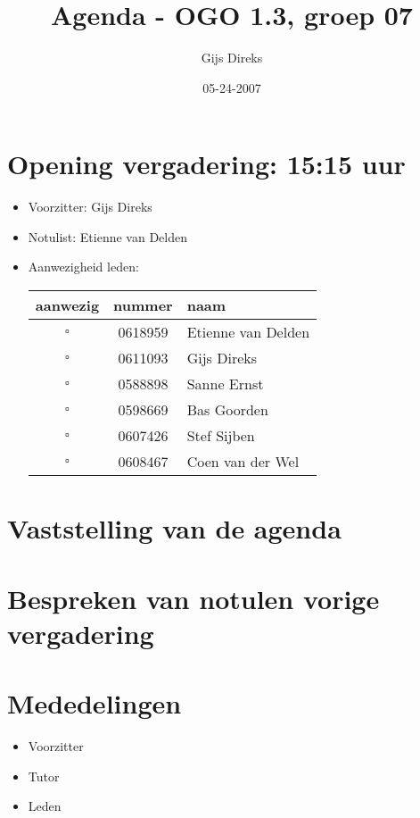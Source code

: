 \documentclass[]{article}
\title{Agenda - OGO 1.3, groep 07 }
\author{Gijs Direks}
\date{05-24-2007}
\begin{document}
\maketitle


\section{Opening vergadering: 15:15 uur }
  \begin{itemize}
    \item Voorzitter: Gijs Direks
    \item Notulist: Etienne van Delden
    \item Aanwezigheid leden: 

    \begin{tabular}{c | c | l}
      aanwezig & nummer & naam \\
      \hline
      $\square$ & 0618959 & Etienne van Delden \\
      $\square$ & 0611093 & Gijs Direks \\
      $\square$ & 0588898 & Sanne Ernst \\
      $\square$ & 0598669 & Bas Goorden \\ 
      $\square$ & 0607426 & Stef Sijben\\
      $\square$ & 0608467 & Coen van der Wel \\

    \end{tabular}
    
  \end{itemize}

\section{Vaststelling van de agenda}

\section{Bespreken van notulen vorige vergadering}

 
 \section{Mededelingen}
 \begin{itemize}
   \item Voorzitter
   \item Tutor
   \item Leden
 \end{itemize}
\end{document}
